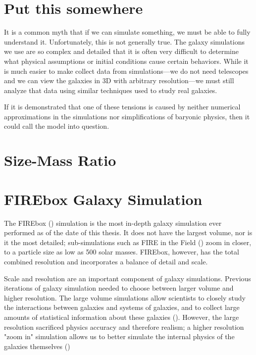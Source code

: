 \section{Put this somewhere}
It is a common myth that if we can simulate something, we must be able to fully understand it. Unfortunately, this is not generally true. The galaxy simulations we use are so complex and detailed that it is often very difficult to determine what physical assumptions or initial conditions cause certain behaviors. While it is much easier to make collect data from simulations---we do not need telescopes and we can view the galaxies in 3D with arbitrary resolution---we must still analyze that data using similar techniques used to study real galaxies.

If it is demonstrated that one of these tensions is caused by neither numerical approximations in the simulations nor simplifications of baryonic physics, then it could call the \lcdm\* model into question.




\section{Size-Mass Ratio}

\section{FIREbox Galaxy Simulation}
The FIREbox (\cite{feldmannFIREboxSimulatingGalaxies2022}) simulation is the most in-depth galaxy simulation ever performed as of the date of this thesis. It does not have the largest volume, nor is it the most detailed; sub-simulations such as FIRE in the Field (\cite{fittsFireFieldSimulating2017}) zoom in closer, to a particle size as low as 500 solar masses. FIREbox, however, has the total combined resolution and incorporates a balance of detail and scale.

Scale and resolution are an important component of galaxy simulations. Previous iterations of galaxy simulation needed to choose between larger volume and higher resolution. The large volume simulations allow scientists to closely study the interactions between galaxies and systems of galaxies, and to collect large amounts of statistical information about these galaxies (\cite{feldmannFIREboxSimulatingGalaxies2022}). However, the large resolution sacrificed physics accuracy and therefore realism; a higher resolution "zoom in" simulation allows us to better simulate the internal physics of the galaxies themselves (\cite{feldmannFIREboxSimulatingGalaxies2022})





